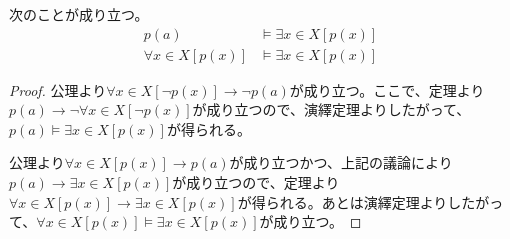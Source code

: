 \documentclass[a4paper]{jsarticle}
\begin{document}
\begin{thm}
\label{1.1.1.6}
次のことが成り立つ。
\begin{align*}
p(a) &\vDash \exists x \in X\left[ p(x) \right] \\
\forall x \in X\left[ p(x) \right] &\vDash \exists x \in X\left[ p(x) \right]
\end{align*}
\end{thm}
\begin{proof}
公理より$\forall x \in X\left[ \neg p(x) \right] \rightarrow \neg p(a)$が成り立つ。ここで、定理より$p(a) \rightarrow \neg\forall x \in X\left[ \neg p(x) \right]$が成り立つので、演繹定理よりしたがって、$p(a) \vDash \exists x \in X\left[ p(x) \right]$が得られる。\par
公理より$\forall x \in X\left[ p(x) \right] \rightarrow p(a)$が成り立つかつ、上記の議論により$p(a) \rightarrow \exists x \in X\left[ p(x) \right]$が成り立つので、定理より$\forall x \in X\left[ p(x) \right] \rightarrow \exists x \in X\left[ p(x) \right]$が得られる。あとは演繹定理よりしたがって、$\forall x \in X\left[ p(x) \right] \vDash \exists x \in X\left[ p(x) \right]$が成り立つ。
\end{proof}
\end{document}
